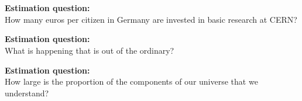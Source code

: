 \section{}




\begin{frame} \Large
    \begin{center}
     \textcolor{LHCbDarkBlue}{\textbf{Estimation question:} }\\ \vspace{1cm}
     How many euros per citizen in Germany are invested in basic research at CERN?
    \end{center} \pause
    \begin{center}  \vspace{1cm}
    \end{center}
\end{frame}

\begin{frame} \Large
    \begin{center}
     \textcolor{LHCbDarkBlue}{\textbf{Estimation question:} }\\ \vspace{1cm}
     What is happening that is out of the ordinary?
    \end{center} \pause
    \begin{center}  \vspace{1cm}
    \end{center}
\end{frame}

\begin{frame} \Large
    \begin{center}
     \textcolor{LHCbDarkBlue}{\textbf{Estimation question:} }\\ \vspace{1cm}
     How large is the proportion of the components of our universe that we understand?
    \end{center}\pause 
    \begin{center}  \vspace{1cm}
    \end{center}
\end{frame}

